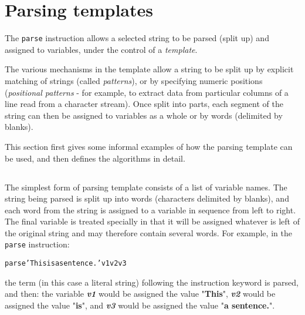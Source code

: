 \chapter{Parsing templates}\label{refparsing}
\index{,}
\index{,}
\index{,}
 The \texttt{parse} instruction allows a selected string to
be parsed (split up) and assigned to variables, under the control of a
\emph{template}.
 
The various mechanisms in the template allow a string to be split up by
explicit matching of strings (called \emph{patterns}), or by
specifying numeric positions (\emph{positional patterns} - for
example, to extract data from particular columns of a line read from a
character stream).
Once split into parts, each segment of the string can then be assigned
to variables as a whole or by words (delimited by blanks).
 
This section first gives some informal examples of how the parsing
template can be used, and then defines the algorithms in detail.
\section{}\label{}
 The simplest form of parsing template consists of a list of variable
names.
The string being parsed is split up into words (characters delimited by
blanks), and each word from the string is assigned to a
variable in sequence from left to right.
The final variable is treated specially in that it will be assigned
whatever is left of the original string and may therefore contain
several words.
For example, in the \texttt{parse} instruction:
\begin{alltt}
parse 'This is a sentence.' v1 v2 v3
\end{alltt}
the term (in this case a literal string) following the instruction
keyword is parsed, and then:  the variable \textbf{\emph{v1}}
would be assigned the value "\textbf{This}", \textbf{\emph{v2}}
would be assigned the value "\textbf{is}",
and \textbf{\emph{v3}} would be assigned the
value "\textbf{a sentence.}".
 
